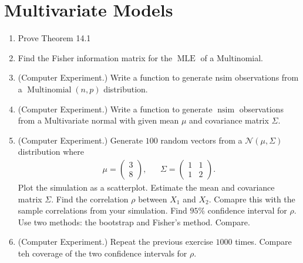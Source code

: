 \documentclass{article}
\newcommand{\MLE}{\operatorname{MLE}}
\begin{document}
\section{Multivariate Models}
\begin{enumerate}
	\item Prove Theorem 14.1
	\item Find the Fisher information matrix for the $\MLE$ of a Multinomial.
	\item (Computer Experiment.) Write a function to generate nsim observations from a $\operatorname{Multinomial}(n, p)$ distribution.
	\item (Computer Experiment.) Write a function to generate $\operatorname{nsim}$ observations from a Multivariate normal with given mean $\mu$ and covariance matrix $\Sigma$.
	\item (Computer Experiment.) Generate $100$ random vectors from a $\mathcal{N}(\mu, \Sigma)$ distribution where
	$$
	\begin{aligned}
	\mu = \begin{pmatrix} 3 \\ 8 \end{pmatrix},&&
	\Sigma = \begin{pmatrix}
	1 & 1 \\
	1 & 2
	\end{pmatrix}.
	\end{aligned}
	$$
	Plot the simulation as a scatterplot. Estimate the mean and covariance matrix $\Sigma$. Find the correlation $\rho$ between $X_1$ and $X_2$. Comapre this with the sample correlations from your simulation. Find $95\%$ confidence interval for $\rho$. Use two methods: the bootstrap and Fisher's method. Compare.
	\item (Computer Experiment.) Repeat the previous exercise $1000$ times. Compare teh coverage of the two confidence intervals for $\rho$.
\end{enumerate}
\end{document}
